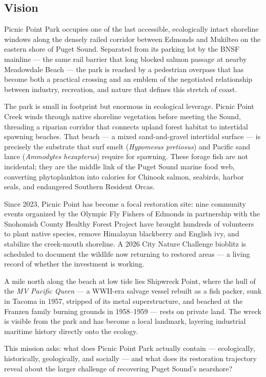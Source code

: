 \documentclass[11pt,letterpaper]{article}
\begin{document}
\subsection{Vision}

Picnic Point Park occupies one of the last accessible, ecologically intact shoreline windows along the densely railed corridor between Edmonds and Mukilteo on the eastern shore of Puget Sound. Separated from its parking lot by the BNSF mainline --- the same rail barrier that long blocked salmon passage at nearby Meadowdale Beach --- the park is reached by a pedestrian overpass that has become both a practical crossing and an emblem of the negotiated relationship between industry, recreation, and nature that defines this stretch of coast.

The park is small in footprint but enormous in ecological leverage. Picnic Point Creek winds through native shoreline vegetation before meeting the Sound, threading a riparian corridor that connects upland forest habitat to intertidal spawning beaches. That beach --- a mixed sand-and-gravel intertidal surface --- is precisely the substrate that surf smelt (\textit{Hypomesus pretiosus}) and Pacific sand lance (\textit{Ammodytes hexapterus}) require for spawning. These forage fish are not incidental; they are the middle link of the Puget Sound marine food web, converting phytoplankton into calories for Chinook salmon, seabirds, harbor seals, and endangered Southern Resident Orcas.

Since 2023, Picnic Point has become a focal restoration site: nine community events organized by the Olympic Fly Fishers of Edmonds in partnership with the Snohomish County Healthy Forest Project have brought hundreds of volunteers to plant native species, remove Himalayan blackberry and English ivy, and stabilize the creek-mouth shoreline. A 2026 City Nature Challenge bioblitz is scheduled to document the wildlife now returning to restored areas --- a living record of whether the investment is working.

A mile north along the beach at low tide lies Shipwreck Point, where the hull of the \textit{MV Pacific Queen} --- a WWII-era salvage vessel rebuilt as a fish packer, sunk in Tacoma in 1957, stripped of its metal superstructure, and beached at the Franzen family burning grounds in 1958--1959 --- rests on private land. The wreck is visible from the park and has become a local landmark, layering industrial maritime history directly onto the ecology.

This mission asks: what does Picnic Point Park actually contain --- ecologically, historically, geologically, and socially --- and what does its restoration trajectory reveal about the larger challenge of recovering Puget Sound's nearshore?
\end{document}
